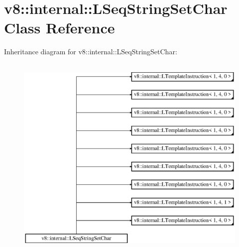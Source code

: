 \hypertarget{classv8_1_1internal_1_1_l_seq_string_set_char}{}\section{v8\+:\+:internal\+:\+:L\+Seq\+String\+Set\+Char Class Reference}
\label{classv8_1_1internal_1_1_l_seq_string_set_char}
Inheritance diagram for v8\+:\+:internal\+:\+:L\+Seq\+String\+Set\+Char\+:\begin{figure}[H]
\begin{center}
\leavevmode
\includegraphics[height=10.000000cm]{classv8_1_1internal_1_1_l_seq_string_set_char}
\end{center}
\end{figure}
